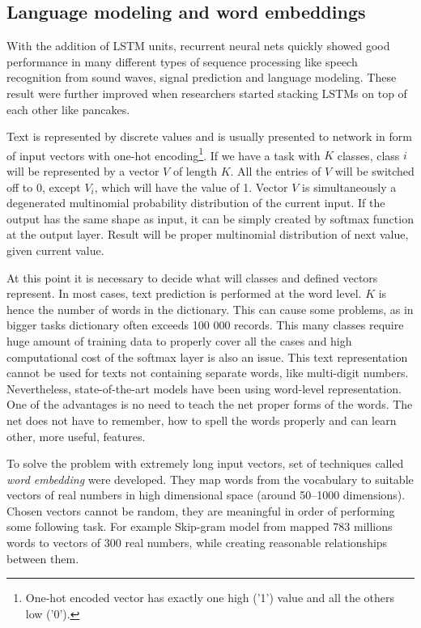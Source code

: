 		\subsection{Language modeling and word embeddings}

With the addition of LSTM units, recurrent neural nets quickly showed good performance in many different types of sequence processing like speech recognition from sound waves, signal prediction and language modeling. These result were further improved when researchers started stacking LSTMs on top of each other like pancakes.

Text is represented by discrete values and is usually presented to network in form of input vectors with one-hot encoding\footnote{One-hot encoded vector has exactly one high ('1') value and all the others low ('0').}. If we have a task with $ K $ classes, class $ i $ will be represented by a vector $ V $ of length $ K $. All the entries of $ V $ will be switched off to 0, except $ V_i $, which will have the value of 1. Vector $ V $ is simultaneously a degenerated multinomial probability distribution of the current input. If the output has the same shape as input, it can be simply created by softmax function at the output layer. Result will be proper multinomial distribution of next value, given current value. 

At this point it is necessary to decide what will classes and defined vectors represent. In most cases, text prediction is performed at the word level. $ K $ is hence the number of words in the dictionary. This can cause some problems, as in bigger tasks dictionary often exceeds 100 000 records. This many classes require huge amount of training data to properly cover all the cases and high computational cost of the softmax layer is also an issue. This text representation cannot be used for texts not containing separate words, like multi-digit numbers. Nevertheless, state-of-the-art models have been using word-level representation. One of the advantages is no need to teach the net proper forms of the words. The net does not have to remember, how to spell the words properly and can learn other, more useful, features.

To solve the problem with extremely long input vectors, set of techniques called \emph{word embedding} were developed. They map words from the vocabulary to suitable vectors of real numbers in high dimensional space (around 50--1000 dimensions). Chosen vectors cannot be random, they are meaningful in order of performing some following task. For example Skip-gram model from \cite{DBLP:journals/corr/abs-1301-3781} mapped 783 millions words to vectors of 300 real numbers, while creating reasonable relationships between them. 


